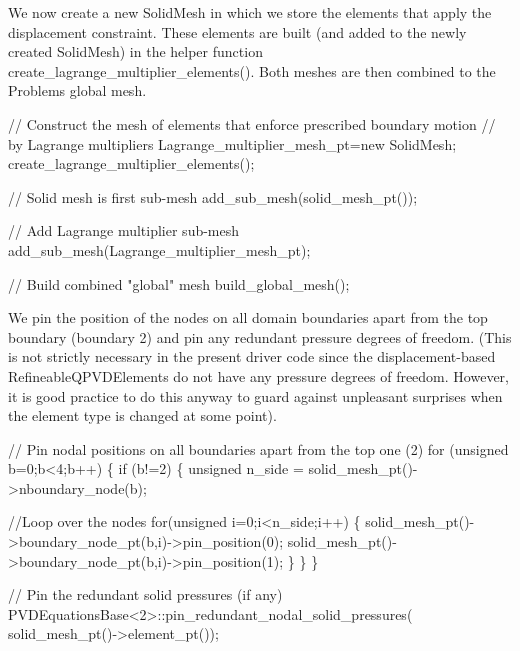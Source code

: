 We now create a new {\ttfamily Solid\+Mesh} in which we store the elements that apply the displacement constraint. These elements are built (and added to the newly created {\ttfamily Solid\+Mesh}) in the helper function {\ttfamily create\+\_\+lagrange\+\_\+multiplier\+\_\+elements()}. Both meshes are then combined to the {\ttfamily Problem\textquotesingle{}s} global mesh.


\begin{DoxyCodeInclude}

 \textcolor{comment}{// Construct the mesh of elements that enforce prescribed boundary motion}
 \textcolor{comment}{// by Lagrange multipliers}
 Lagrange\_multiplier\_mesh\_pt=\textcolor{keyword}{new} SolidMesh;
 create\_lagrange\_multiplier\_elements();
 
 \textcolor{comment}{// Solid mesh is first sub-mesh}
 add\_sub\_mesh(solid\_mesh\_pt());

 \textcolor{comment}{// Add Lagrange multiplier sub-mesh}
 add\_sub\_mesh(Lagrange\_multiplier\_mesh\_pt);

 \textcolor{comment}{// Build combined "global" mesh}
 build\_global\_mesh();

\end{DoxyCodeInclude}


We pin the position of the nodes on all domain boundaries apart from the top boundary (boundary 2) and pin any redundant pressure degrees of freedom. (This is not strictly necessary in the present driver code since the displacement-\/based {\ttfamily Refineable\+Q\+P\+V\+D\+Elements} do not have any pressure degrees of freedom. However, it is good practice to do this anyway to guard against unpleasant surprises when the element type is changed at some point).


\begin{DoxyCodeInclude}
 
 \textcolor{comment}{// Pin nodal positions on all boundaries apart from the top one (2) }
 \textcolor{keywordflow}{for} (\textcolor{keywordtype}{unsigned} b=0;b<4;b++)
  \{
   \textcolor{keywordflow}{if} (b!=2)
    \{
     \textcolor{keywordtype}{unsigned} n\_side = solid\_mesh\_pt()->nboundary\_node(b);
     
     \textcolor{comment}{//Loop over the nodes}
     \textcolor{keywordflow}{for}(\textcolor{keywordtype}{unsigned} i=0;i<n\_side;i++)
      \{
       solid\_mesh\_pt()->boundary\_node\_pt(b,i)->pin\_position(0);
       solid\_mesh\_pt()->boundary\_node\_pt(b,i)->pin\_position(1);
      \}
    \}
  \}

 \textcolor{comment}{// Pin the redundant solid pressures (if any)}
 PVDEquationsBase<2>::pin\_redundant\_nodal\_solid\_pressures(
  solid\_mesh\_pt()->element\_pt());

\end{DoxyCodeInclude}


